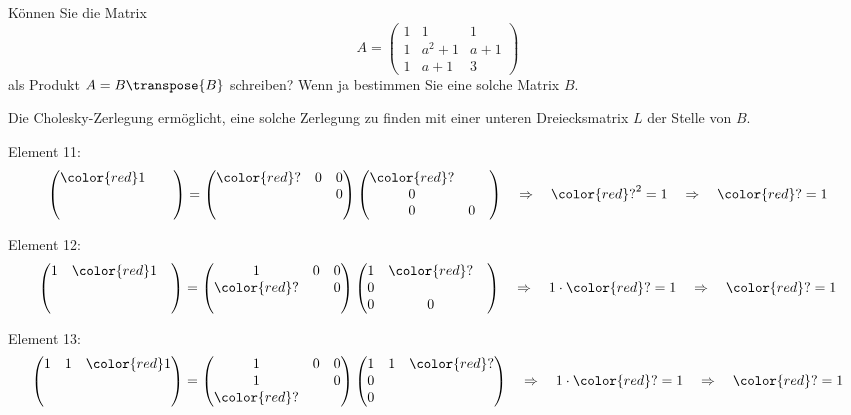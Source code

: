 Können Sie die Matrix 
\[
A
=
\begin{pmatrix}
  1&    1&1\\
  1&a^2+1&a+1\\
  1&a  +1&3
\end{pmatrix}
\]
als Produkt $A=B\transpose{B}$ schreiben?
Wenn ja bestimmen Sie eine solche Matrix $B$.


\begin{loesung}
Die Cholesky-Zerlegung ermöglicht, eine solche Zerlegung zu finden mit
einer unteren Dreiecksmatrix $L$ der Stelle von $B$.

Element 11:
\[
\begin{pmatrix}
\color{red}1&&\\
 &&\\
 &&
\end{pmatrix}
=
\begin{pmatrix}
{\color{red}?}&0&0\\
 & &0\\
 & &
\end{pmatrix}
\begin{pmatrix}
{\color{red}?}& & \\
0& & \\
0&0&
\end{pmatrix}
\quad\Rightarrow\quad
{\color{red}?}^2 = 1
\quad\Rightarrow\quad
{\color{red}?}=1
\]

Element 12:
\[
\begin{pmatrix}
1 & \color{red}1 & \\
  &              & \\
  &              &
\end{pmatrix}
=
\begin{pmatrix}
1           & 0 & 0\\
\color{red}?&   & 0\\
            &   &  
\end{pmatrix}
\begin{pmatrix}
1 &\color{red}? &  \\
0 &             &  \\
0 &           0 &  
\end{pmatrix}
\quad\Rightarrow\quad
1\cdot{\color{red}?} = 1
\quad\Rightarrow\quad
{\color{red}?} = 1
\]

Element 13:
\[
\begin{pmatrix}
1 & 1 & \color{red}1\\
  &   &             \\
  &   &
\end{pmatrix}
=
\begin{pmatrix}
1           & 0 & 0\\
1           &   & 0\\
\color{red}?&   &
\end{pmatrix}
\begin{pmatrix}
1 & 1 & \color{red}? \\
0 &   &              \\
0 &   &  
\end{pmatrix}
\quad\Rightarrow\quad
1\cdot{\color{red}?} = 1
\quad\Rightarrow\quad
{\color{red}?} = 1
\]


\end{loesung}
